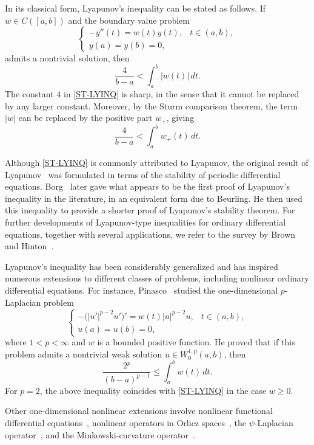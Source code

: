 \documentclass[twoside,12pt,letter]{article}
\theoremstyle{plain}
\theoremstyle{definition}
\theoremstyle{remark}
\numberwithin{equation}{section}
\begin{document}
In its classical form, Lyapunov's inequality can be stated as follows. If
\(w\in C([a,b])\) and the boundary value problem
\[
\left\{
\begin{array}{ll}
-y''(t)=w(t)y(t), & t\in(a,b),\\[2mm]
y(a)=y(b)=0,
\end{array}
\right.
\]
admits a nontrivial solution, then
\begin{equation}\label{ST-LYINQ}
\frac{4}{b-a}<\int_a^b |w(t)|\,dt.
\end{equation}
The constant \(4\) in \eqref{ST-LYINQ} is sharp, in the sense that it cannot
be replaced by any larger constant. Moreover, by the Sturm comparison theorem, the
term \(|w|\) can be replaced by the positive part \(w_+\), giving
\[
\frac{4}{b-a}<\int_a^b w_+(t)\,dt.
\]


Although \eqref{ST-LYINQ} is commonly attributed to Lyapunov, the original
result of Lyapunov~\cite{Lyapunov} was formulated in terms of the stability of periodic
differential equations.  Borg~\cite{Borg} later gave what appears to be the first proof of Lyapunov's
inequality in the literature, in an equivalent form due to Beurling. He then
used this inequality to provide a shorter proof of Lyapunov's stability theorem. For further developments of Lyapunov-type inequalities for ordinary
differential equations, together with several applications, we refer to the
survey by Brown and Hinton~\cite{BrownHinton2000}.


Lyapunov's inequality has been considerably generalized and has inspired numerous
extensions to different classes of problems, including nonlinear ordinary
differential equations. For instance, Pinasco~\cite{Pinasco-04} studied the
one-dimensional \(p\)-Laplacian problem
\[
\left\{
\begin{array}{ll}
-\bigl(|u'|^{p-2}u'\bigr)'=w(t)|u|^{p-2}u, & t\in(a,b),\\[2mm]
u(a)=u(b)=0,
\end{array}
\right.
\]
where \(1<p<\infty\) and \(w\) is a bounded positive function. He proved that
if this problem admits a nontrivial weak solution \(u\in W_0^{1,p}(a,b)\), then
\[
\frac{2^p}{(b-a)^{p-1}}
\le
\int_a^b w(t)\,dt.
\]
For \(p=2\), the above inequality  coincides with \eqref{ST-LYINQ} in the case \(w\ge0\).

Other one-dimensional nonlinear extensions involve nonlinear functional
differential equations~\cite{Eliason}, nonlinear operators in Orlicz
spaces~\cite{deNapoliPinasco2005}, the \(\psi\)-Laplacian
operator~\cite{Sanchez}, and the Minkowski-curvature
operator~\cite{Liu,Liu2,Yang-19}.
\end{document}
